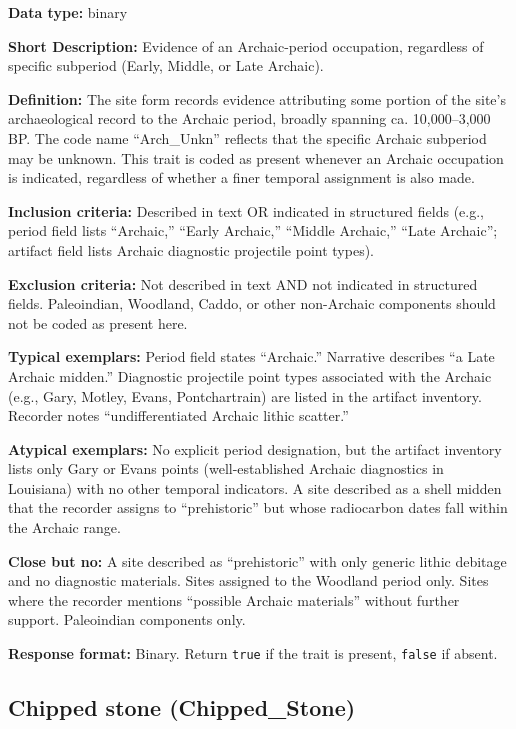 \documentclass[
]{article}
\begin{document}
\textbf{Data type:} binary

\textbf{Short Description:} Evidence of an Archaic-period occupation,
regardless of specific subperiod (Early, Middle, or Late Archaic).

\textbf{Definition:} The site form records evidence attributing some
portion of the site's archaeological record to the Archaic period,
broadly spanning ca. 10,000--3,000 BP. The code name ``Arch\_Unkn''
reflects that the specific Archaic subperiod may be unknown. This trait
is coded as present whenever an Archaic occupation is indicated,
regardless of whether a finer temporal assignment is also made.

\textbf{Inclusion criteria:} Described in text OR indicated in
structured fields (e.g., period field lists ``Archaic,'' ``Early
Archaic,'' ``Middle Archaic,'' ``Late Archaic''; artifact field lists
Archaic diagnostic projectile point types).

\textbf{Exclusion criteria:} Not described in text AND not indicated in
structured fields. Paleoindian, Woodland, Caddo, or other non-Archaic
components should not be coded as present here.

\textbf{Typical exemplars:} Period field states ``Archaic.'' Narrative
describes ``a Late Archaic midden.'' Diagnostic projectile point types
associated with the Archaic (e.g., Gary, Motley, Evans, Pontchartrain)
are listed in the artifact inventory. Recorder notes ``undifferentiated
Archaic lithic scatter.''

\textbf{Atypical exemplars:} No explicit period designation, but the
artifact inventory lists only Gary or Evans points (well-established
Archaic diagnostics in Louisiana) with no other temporal indicators. A
site described as a shell midden that the recorder assigns to
``prehistoric'' but whose radiocarbon dates fall within the Archaic
range.

\textbf{Close but no:} A site described as ``prehistoric'' with only
generic lithic debitage and no diagnostic materials. Sites assigned to
the Woodland period only. Sites where the recorder mentions ``possible
Archaic materials'' without further support. Paleoindian components
only.

\textbf{Response format:} Binary. Return \texttt{true} if the trait is
present, \texttt{false} if absent.

\subsection{Chipped stone
(Chipped\_Stone)}\label{chipped-stone-chipped_stone}
\end{document}
